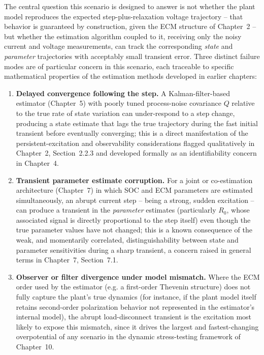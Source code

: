 The central question this scenario is designed to answer is not whether the plant model reproduces the expected step-plus-relaxation voltage trajectory -- that behavior is guaranteed by construction, given the ECM structure of Chapter~2 -- but whether the estimation algorithm coupled to it, receiving only the noisy current and voltage measurements, can track the corresponding \emph{state} and \emph{parameter} trajectories with acceptably small transient error. Three distinct failure modes are of particular concern in this scenario, each traceable to specific mathematical properties of the estimation methods developed in earlier chapters:

\begin{enumerate}
	\item \textbf{Delayed convergence following the step.} A Kalman-filter-based estimator (Chapter~5) with poorly tuned process-noise covariance $Q$ relative to the true rate of state variation can under-respond to a step change, producing a state estimate that lags the true trajectory during the fast initial transient before eventually converging; this is a direct manifestation of the persistent-excitation and observability considerations flagged qualitatively in Chapter~2, Section~2.2.3 and developed formally as an identifiability concern in Chapter~4.
	\item \textbf{Transient parameter estimate corruption.} For a joint or co-estimation architecture (Chapter~7) in which SOC and ECM parameters are estimated simultaneously, an abrupt current step -- being a strong, sudden excitation -- can produce a transient in the \emph{parameter} estimates (particularly $R_0$, whose associated signal is directly proportional to the step itself) even though the true parameter values have not changed; this is a known consequence of the weak, and momentarily correlated, distinguishability between state and parameter sensitivities during a sharp transient, a concern raised in general terms in Chapter~7, Section~7.1.
	\item \textbf{Observer or filter divergence under model mismatch.} Where the ECM order used by the estimator (e.g. a first-order Thevenin structure) does not fully capture the plant's true dynamics (for instance, if the plant model itself retains second-order polarization behavior not represented in the estimator's internal model), the abrupt load-disconnect transient is the excitation most likely to expose this mismatch, since it drives the largest and fastest-changing overpotential of any scenario in the dynamic stress-testing framework of Chapter~10.
\end{enumerate}

